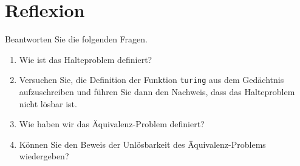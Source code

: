 \section{Reflexion}
Beantworten Sie die folgenden Fragen.
\begin{enumerate}
\item Wie ist das Halteproblem definiert?
\item Versuchen Sie, die Definition der Funktion \texttt{turing} aus dem Gedächtnis aufzuschreiben und führen Sie
      dann den Nachweis, dass das Halteproblem nicht lösbar ist.
\item Wie haben wir das Äquivalenz-Problem definiert?
\item Können Sie den Beweis der Unlösbarkeit des Äquivalenz-Problems wiedergeben?
\end{enumerate}



